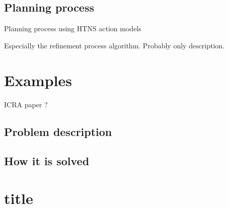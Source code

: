 \subsection{Planning process}
Planning process using HTNS action models

Especially the refinement process algorithm. Probably only description.

\section{Examples}

ICRA paper ?

\subsection{Problem description}
\subsection{How it is solved}


\section{title}
